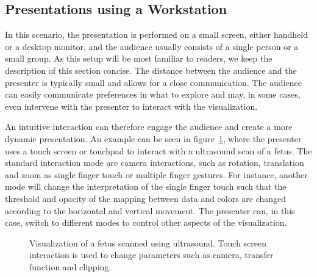 \documentclass[review,journal]{vgtc}         %
\begin{document}
%
%
\subsection{Presentations using a Workstation} \label{sec:workstation}
In this scenario, the presentation is performed on a small screen, either handheld or a desktop monitor, and the audience usually consists of a single person or a small group.
As this setup will be most familiar to readers, we keep the description of this section concise.
The distance between the audience and the presenter is typically small and allows for a close communication.
The audience can easily communicate preferences in what to explore and may, in some cases, even intervene with the presenter to interact with the visualization.

An intuitive interaction can therefore engage the audience and create a more dynamic presentation.
An example can be seen in figure~\ref{img:touch_workstation}, where the presenter uses a touch screen or touchpad to interact with a ultrasound scan of a fetus.
The standard interaction mode are camera interactions, such as rotation, translation and zoom as single finger touch or multiple finger gestures.
For instance, another mode will change the interpretation of the single finger touch such that the threshold and opacity of the mapping between data and colors are changed according to the horizontal and vertical movement. 
The presenter can, in this case, switch to different modes to control other aspects of the visualization.

%
%
%
%

\begin{figure}
	\centering
	\caption{Visualization of a fetus scanned using ultrasound. Touch screen interaction is used to change parameters such as camera, transfer function and clipping.}
	\label{img:touch_workstation}
\end{figure}
\end{document}
